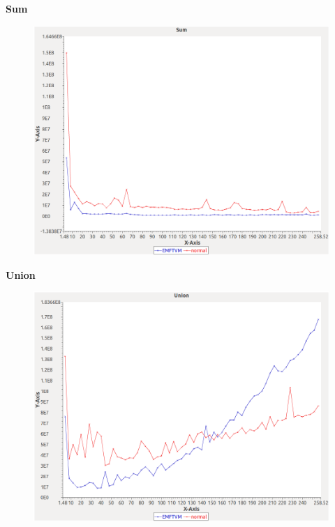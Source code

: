 \noindent\textbf{Sum}

\begin{figure}[h]
\centering
\includegraphics[width=\textwidth]{../graphs/orderedset/Sum}
\end{figure}
\pagebreak

\noindent\textbf{Union}

\begin{figure}[h]
\centering
\includegraphics[width=\textwidth]{../graphs/orderedset/Union}
\end{figure}
\pagebreak